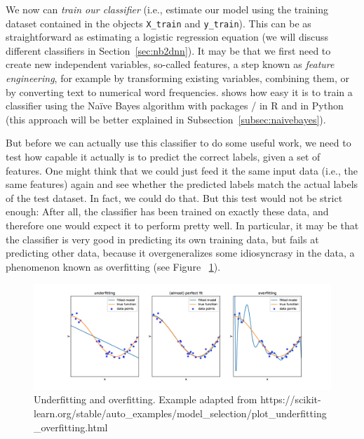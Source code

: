 
We now can \emph{train our classifier} (i.e., estimate our model using the
training dataset contained in the objects \texttt{X\_train} and \texttt{y\_train}). This can be as straightforward as estimating a
logistic regression equation (we will discuss different classifiers in
Section~\ref{sec:nb2dnn}).  It may be that we first need to create new
independent variables, so-called features, a step known as
\emph{feature engineering}, for example by transforming existing
variables, combining them, or by converting text to numerical word
frequencies.
 shows how easy it is to train a classifier using the Na\"ive Bayes algorithm with packages / in R and  in Python (this approach will be better explained in Subsection~\ref{subsec:naivebayes}).


But before we can actually use this classifier to do some useful work, we need to test how capable it actually is to predict the
correct labels, given a set of features. One might think that we could
just feed it the same input data (i.e., the same features) again and
see whether the predicted labels match the actual labels of the test
dataset.  In fact, we could do that.  But this test would not be
strict enough: After all, the classifier has been trained on exactly
these data, and therefore one would expect it to perform pretty well.
In particular, it may be that the classifier is very good in
predicting its own training data, but fails at predicting other data,
because it overgeneralizes some idiosyncrasy in the data, a phenomenon
known as overfitting (see Figure ~\ref{fig:overfit}).

\begin{figure} 
\centering
\includegraphics[width=\linewidth]{figures/ch09_overfitting}
\caption{Underfitting and overfitting. Example adapted from https://scikit-learn.org/stable/auto\_examples/model\_selection/plot\_underfitting\_overfitting.html}
\label{fig:overfit}
\end{figure}

